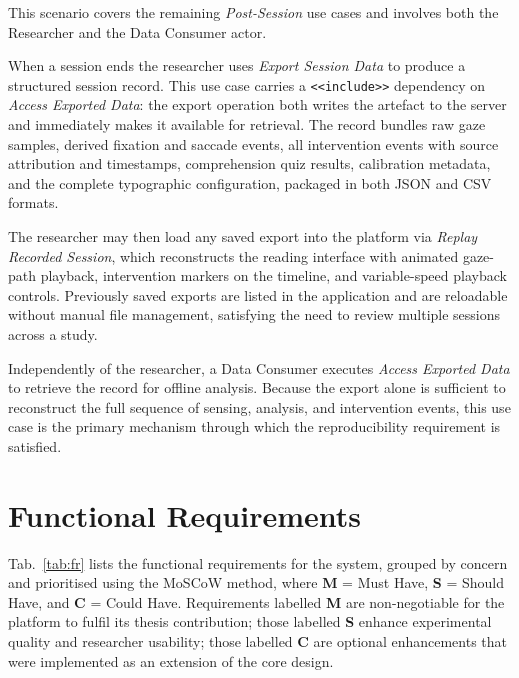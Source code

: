 This scenario covers the remaining \textit{Post-Session} use cases and involves
both the Researcher and the Data Consumer actor.

When a session ends the researcher uses \textit{Export Session Data} to produce
a structured session record.
This use case carries a \texttt{<<include>>} dependency on \textit{Access Exported
Data}: the export operation both writes the artefact to the server and immediately
makes it available for retrieval.
The record bundles raw gaze samples, derived fixation and saccade events, all
intervention events with source attribution and timestamps, comprehension quiz
results, calibration metadata, and the complete typographic configuration,
packaged in both JSON and CSV formats.

The researcher may then load any saved export into the platform via
\textit{Replay Recorded Session}, which reconstructs the reading interface with
animated gaze-path playback, intervention markers on the timeline, and
variable-speed playback controls.
Previously saved exports are listed in the application and are reloadable without
manual file management, satisfying the need to review multiple sessions across a
study.

Independently of the researcher, a Data Consumer executes \textit{Access Exported
Data} to retrieve the record for offline analysis.
Because the export alone is sufficient to reconstruct the full sequence of
sensing, analysis, and intervention events, this use case is the primary
mechanism through which the reproducibility requirement is satisfied.


\section{Functional Requirements}
\label{sec:functional-requirements}

Tab.~\ref{tab:fr} lists the functional requirements for the system, grouped by
concern and prioritised using the MoSCoW method, where \textbf{M} = Must Have,
\textbf{S} = Should Have, and \textbf{C} = Could Have.
Requirements labelled \textbf{M} are non-negotiable for the platform to fulfil
its thesis contribution; those labelled \textbf{S} enhance experimental quality
and researcher usability; those labelled \textbf{C} are optional enhancements
that were implemented as an extension of the core design.

